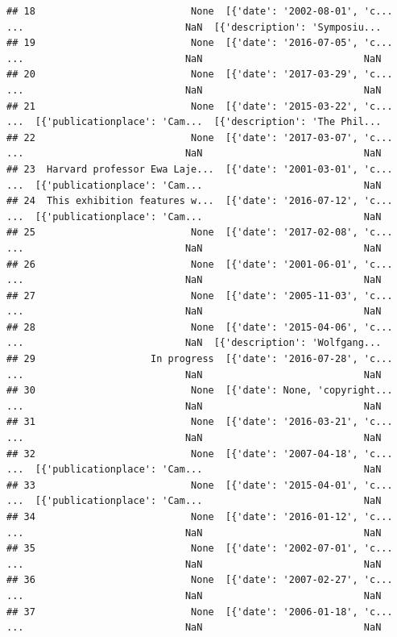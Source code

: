 \documentclass[
]{book}
\begin{document}
\begin{alert}
\begin{verbatim}
## 18                           None  [{'date': '2002-08-01', 'c...  ...                            NaN  [{'description': 'Symposiu...
## 19                           None  [{'date': '2016-07-05', 'c...  ...                            NaN                            NaN
## 20                           None  [{'date': '2017-03-29', 'c...  ...                            NaN                            NaN
## 21                           None  [{'date': '2015-03-22', 'c...  ...  [{'publicationplace': 'Cam...  [{'description': 'The Phil...
## 22                           None  [{'date': '2017-03-07', 'c...  ...                            NaN                            NaN
## 23  Harvard professor Ewa Laje...  [{'date': '2001-03-01', 'c...  ...  [{'publicationplace': 'Cam...                            NaN
## 24  This exhibition features w...  [{'date': '2016-07-12', 'c...  ...  [{'publicationplace': 'Cam...                            NaN
## 25                           None  [{'date': '2017-02-08', 'c...  ...                            NaN                            NaN
## 26                           None  [{'date': '2001-06-01', 'c...  ...                            NaN                            NaN
## 27                           None  [{'date': '2005-11-03', 'c...  ...                            NaN                            NaN
## 28                           None  [{'date': '2015-04-06', 'c...  ...                            NaN  [{'description': 'Wolfgang...
## 29                    In progress  [{'date': '2016-07-28', 'c...  ...                            NaN                            NaN
## 30                           None  [{'date': None, 'copyright...  ...                            NaN                            NaN
## 31                           None  [{'date': '2016-03-21', 'c...  ...                            NaN                            NaN
## 32                           None  [{'date': '2007-04-18', 'c...  ...  [{'publicationplace': 'Cam...                            NaN
## 33                           None  [{'date': '2015-04-01', 'c...  ...  [{'publicationplace': 'Cam...                            NaN
## 34                           None  [{'date': '2016-01-12', 'c...  ...                            NaN                            NaN
## 35                           None  [{'date': '2002-07-01', 'c...  ...                            NaN                            NaN
## 36                           None  [{'date': '2007-02-27', 'c...  ...                            NaN                            NaN
## 37                           None  [{'date': '2006-01-18', 'c...  ...                            NaN                            NaN

\end{verbatim}
\end{alert}
\end{document}
